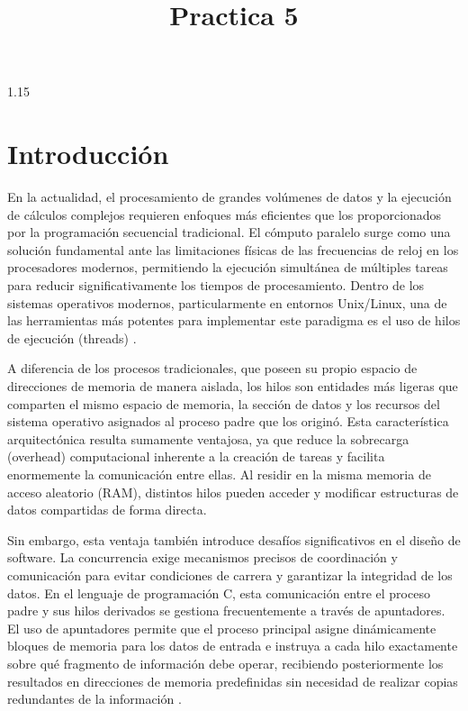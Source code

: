 \documentclass[11pt, a4paper]{article}
\title{\textbf{Practica 5}}
\begin{document}
\begin{spacing}{1.15}

\maketitle

\section*{Introducción}

En la actualidad, el procesamiento de grandes volúmenes de datos y la ejecución de cálculos complejos requieren enfoques más eficientes que los proporcionados por la programación secuencial tradicional. El cómputo paralelo surge como una solución fundamental ante las limitaciones físicas de las frecuencias de reloj en los procesadores modernos, permitiendo la ejecución simultánea de múltiples tareas para reducir significativamente los tiempos de procesamiento. Dentro de los sistemas operativos modernos, particularmente en entornos Unix/Linux, una de las herramientas más potentes para implementar este paradigma es el uso de hilos de ejecución (threads) \cite{marquez2015}.

A diferencia de los procesos tradicionales, que poseen su propio espacio de direcciones de memoria de manera aislada, los hilos son entidades más ligeras que comparten el mismo espacio de memoria, la sección de datos y los recursos del sistema operativo asignados al proceso padre que los originó. Esta característica arquitectónica resulta sumamente ventajosa, ya que reduce la sobrecarga (overhead) computacional inherente a la creación de tareas y facilita enormemente la comunicación entre ellas. Al residir en la misma memoria de acceso aleatorio (RAM), distintos hilos pueden acceder y modificar estructuras de datos compartidas de forma directa. 

Sin embargo, esta ventaja también introduce desafíos significativos en el diseño de software. La concurrencia exige mecanismos precisos de coordinación y comunicación para evitar condiciones de carrera y garantizar la integridad de los datos. En el lenguaje de programación C, esta comunicación entre el proceso padre y sus hilos derivados se gestiona frecuentemente a través de apuntadores. El uso de apuntadores permite que el proceso principal asigne dinámicamente bloques de memoria para los datos de entrada e instruya a cada hilo exactamente sobre qué fragmento de información debe operar, recibiendo posteriormente los resultados en direcciones de memoria predefinidas sin necesidad de realizar copias redundantes de la información \cite{marquez2015}.


\end{spacing}
\end{document}
